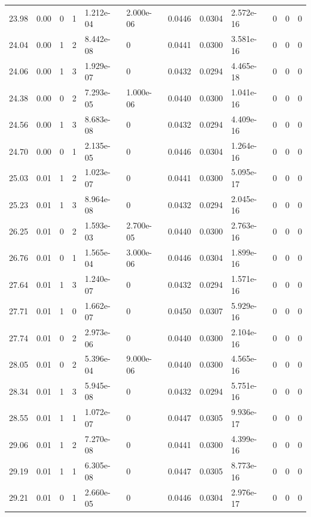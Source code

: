 \documentclass[preview]{standalone}
\begin{document}
{{{\begin{tabular}{L{1.2cm}C{1.2cm} C{0.3cm}C{0.5cm} C{1.4cm}C{1.4cm} C{1.4cm}C{1.4cm} C{1.6cm}C{1.6cm} C{1.6cm}C{1.6cm}}
  23.98  &  0.00  & 0     &  1 &  1.212e-04  & 2.000e-06  &  0.0446&   0.0304& 2.572e-16 & 0   &  0 & 0  \\ 
  24.04  &  0.00  & 1     &  2 &  8.442e-08  & 0  &  0.0441&   0.0300& 3.581e-16 & 0   &  0 & 0  \\ 
  24.06  &  0.00  & 1     &  3 &  1.929e-07  & 0  &  0.0432&   0.0294& 4.465e-18 & 0   &  0 & 0  \\ 
  24.38  &  0.00  & 0     &  2 &  7.293e-05  & 1.000e-06  &  0.0440&   0.0300& 1.041e-16 & 0   &  0 & 0  \\ 
  24.56  &  0.00  & 1     &  3 &  8.683e-08  & 0  &  0.0432&   0.0294& 4.409e-16 & 0   &  0 & 0  \\ 
  24.70  &  0.00  & 0     &  1 &  2.135e-05  & 0  &  0.0446&   0.0304& 1.264e-16 & 0   &  0 & 0  \\ 
  25.03  &  0.01  & 1     &  2 &  1.023e-07  & 0  &  0.0441&   0.0300& 5.095e-17 & 0   &  0 & 0  \\ 
  25.23  &  0.01  & 1     &  3 &  8.964e-08  & 0  &  0.0432&   0.0294& 2.045e-16 & 0   &  0 & 0  \\ 
  26.25  &  0.01  & 0     &  2 &  1.593e-03  & 2.700e-05  &  0.0440&   0.0300& 2.763e-16 & 0   &  0 & 0  \\ 
  26.76  &  0.01  & 0     &  1 &  1.565e-04  & 3.000e-06  &  0.0446&   0.0304& 1.899e-16 & 0   &  0 & 0  \\ 
  27.64  &  0.01  & 1     &  3 &  1.240e-07  & 0  &  0.0432&   0.0294& 1.571e-16 & 0   &  0 & 0  \\ 
  27.71  &  0.01  & 1     &  0 &  1.662e-07  & 0  &  0.0450&   0.0307& 5.929e-16 & 0   &  0 & 0  \\ 
  27.74  &  0.01  & 0     &  2 &  2.973e-06  & 0  &  0.0440&   0.0300& 2.104e-16 & 0   &  0 & 0  \\ 
  28.05  &  0.01  & 0     &  2 &  5.396e-04  & 9.000e-06  &  0.0440&   0.0300& 4.565e-16 & 0   &  0 & 0  \\ 
  28.34  &  0.01  & 1     &  3 &  5.945e-08  & 0  &  0.0432&   0.0294& 5.751e-16 & 0   &  0 & 0  \\ 
  28.55  &  0.01  & 1     &  1 &  1.072e-07  & 0  &  0.0447&   0.0305& 9.936e-17 & 0   &  0 & 0  \\ 
  29.06  &  0.01  & 1     &  2 &  7.270e-08  & 0  &  0.0441&   0.0300& 4.399e-16 & 0   &  0 & 0  \\ 
  29.19  &  0.01  & 1     &  1 &  6.305e-08  & 0  &  0.0447&   0.0305& 8.773e-16 & 0   &  0 & 0  \\ 
  29.21  &  0.01  & 0     &  1 &  2.660e-05  & 0  &  0.0446&   0.0304& 2.976e-17 & 0   &  0 & 0  \\ 

\end{tabular}}}}
\end{document}
